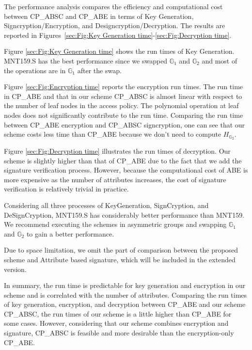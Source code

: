 \documentclass[letterpaper,12pt]{article}
\newcommand{\Gone}{\mathbb{G}_1}
\newcommand{\Gtwo}{\mathbb{G}_2}
\begin{document}
The performance analysis compares the efficiency and computational cost between CP\_ABSC and CP\_ABE  in terms of Key Generation, Signcryption/Encryption, and Designcryption/Decryption. The results are reported in Figures~\ref{sec:Fig:Key Generation time}-\ref{sec:Fig:Decryption time}.


Figure \ref{sec:Fig:Key Generation time} shows the run times of Key Generation. MNT159.S has the best performance since we swapped $\Gone$ and $\Gtwo$ and most of the operations are in $\Gone$ after the swap.

Figure \ref{sec:Fig:Encryption time} reports the encryption run times. The run time in CP\_ABE and that in our scheme CP\_ABSC is almost linear with respect to the number of leaf nodes in the access policy. The polynomial operation at leaf nodes does not significantly contribute to the run time. Comparing the run time between CP\_ABE encryption and CP\_ABSC signcryption, one can see that our scheme costs less time than CP\_ABE because we don't need to compute $H_{\Gtwo}$.


Figure \ref{sec:Fig:Decryption time} illustrates the run times of decryption. Our scheme is slightly higher than that of CP\_ABE due to the fact that we add the signature verification process. However, because the computational cost of ABE is more expensive as the number of attributes increases, the cost of signature verification is relatively trivial in practice.

Considering all three processes of KeyGeneration, SignCryption, and DeSignCryption, MNT159.S has considerably better performance than MNT159. We recommend executing the schemes in asymmetric groups and swapping $\Gone$ and $\Gtwo$ to gain a better performance.

Due to space limitation, we omit the part of comparison between the proposed scheme and Attribute based signature, which will be included in the extended version.

In summary, the run time is predictable for key generation and encryption in our scheme and is correlated with the number of attributes. Comparing the run times of key generation, encryption, and decryption between CP\_ABE and our scheme CP\_ABSC, the run times of our scheme is a little higher than CP\_ABE for some cases. However, considering that our scheme combines encryption and signature, CP\_ABSC is feasible and more desirable than the encryption-only CP\_ABE.
\end{document}
